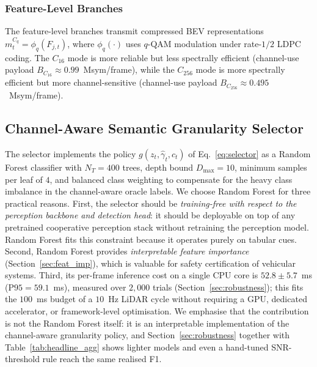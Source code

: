 \documentclass[journal]{IEEEtran}
\begin{document}
\subsubsection{Feature-Level Branches}
The feature-level branches transmit compressed BEV representations $m_t^{C_q} = \phi_q(F_{j,t})$, where $\phi_q(\cdot)$ uses $q$-QAM modulation under rate-$1/2$ LDPC coding. The $C_{16}$ mode is more reliable but less spectrally efficient (channel-use payload $B_{C_{16}} \approx 0.99$~Msym/frame), while the $C_{256}$ mode is more spectrally efficient but more channel-sensitive (channel-use payload $B_{C_{256}} \approx 0.495$~Msym/frame).

\subsection{Channel-Aware Semantic Granularity Selector}

The selector implements the policy $g(z_t,\hat\gamma_t,c_t)$ of Eq.~\eqref{eq:selector} as a Random Forest classifier with $N_T=400$ trees, depth bound $D_{\max}=10$, minimum samples per leaf of $4$, and balanced class weighting to compensate for the heavy class imbalance in the channel-aware oracle labels. We choose Random Forest for three practical reasons. First, the selector should be \emph{training-free with respect to the perception backbone and detection head}: it should be deployable on top of any pretrained cooperative perception stack without retraining the perception model. Random Forest fits this constraint because it operates purely on tabular cues. Second, Random Forest provides \emph{interpretable feature importance} (Section~\ref{sec:feat_imp}), which is valuable for safety certification of vehicular systems. Third, its per-frame inference cost on a single CPU core is $52.8 \pm 5.7$~ms ($\mathrm{P95} = 59.1$~ms), measured over $2{,}000$ trials (Section~\ref{sec:robustness}); this fits the $100$~ms budget of a $10$~Hz LiDAR cycle without requiring a GPU, dedicated accelerator, or framework-level optimisation. We emphasise that the contribution is not the Random Forest itself: it is an interpretable implementation of the channel-aware granularity policy, and Section~\ref{sec:robustness} together with Table~\ref{tab:headline_agg} shows lighter models and even a hand-tuned SNR-threshold rule reach the same realised F1.
\end{document}
